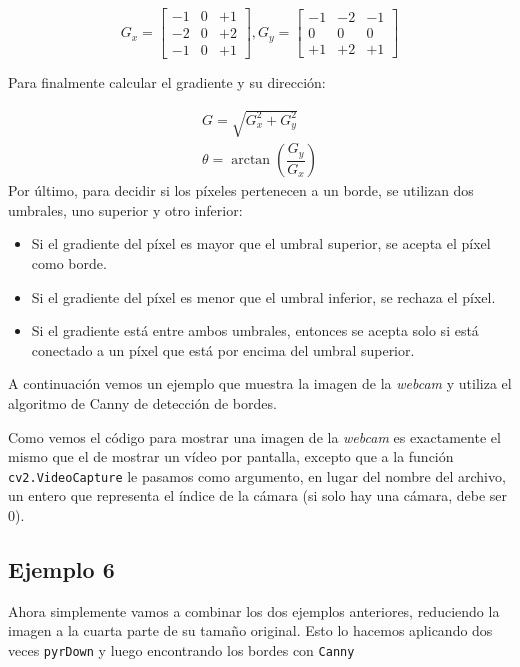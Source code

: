 \documentclass[a4paper,openright, 12pt]{book}
\begin{document}
\begin{equation*}
G_{x} = \begin{bmatrix} -1 & 0 & +1 \\ -2 & 0 & +2 \\ -1 & 0 & +1 \end{bmatrix},  G_{y} = \begin{bmatrix} -1 & -2 & -1 \\ 0 & 0 & 0 \\ +1 & +2 & +1 \end{bmatrix}
\end{equation*}

Para finalmente calcular el gradiente y su dirección:

\begin{equation*}
\begin{array}{l} G = \sqrt{ G_{x}^{2} + G_{y}^{2} } \\ \theta = \arctan(\dfrac{ G_{y} }{ G_{x} }) \end{array}
\end{equation*}
Por último, para decidir si los píxeles pertenecen a un borde, se utilizan dos umbrales, uno superior y otro inferior:
\begin{itemize}
\item Si el gradiente del píxel es mayor que el umbral superior, se acepta el píxel como borde.
\item Si el gradiente del píxel es menor que el umbral inferior, se rechaza el píxel.
\item Si el gradiente está entre ambos umbrales, entonces se acepta solo si está conectado a un píxel que está por encima del umbral superior.
\end{itemize}

A continuación vemos un ejemplo que muestra la imagen de la \textit{webcam} y utiliza el algoritmo de Canny de detección de bordes.

\newpage

Como vemos el código para mostrar una imagen de la \textit{webcam} es exactamente el mismo que el de mostrar un vídeo por pantalla, excepto que a la función \lstinline|cv2.VideoCapture| le pasamos como argumento, en lugar del nombre del archivo, un entero que representa el índice de la cámara (si solo hay una cámara, debe ser 0).
\newpage

\newpage 
\subsection*{Ejemplo 6}
Ahora simplemente vamos a combinar los dos ejemplos anteriores, reduciendo la imagen a la cuarta parte de su tamaño original. Esto lo hacemos aplicando dos veces \lstinline|pyrDown| y luego encontrando los bordes con \lstinline|Canny|

\newpage
\end{document}
